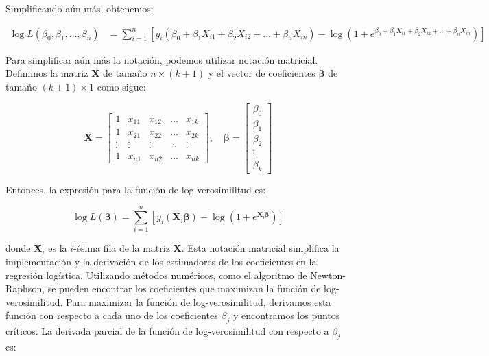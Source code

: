 Simplificando aún más, obtenemos:

\begin{eqnarray}
\log L(\beta_0, \beta_1, \ldots, \beta_n) &= \sum_{i=1}^{n} \left[ y_i (\beta_0 + \beta_1 X_{i1} + \beta_2 X_{i2} + \ldots + \beta_n X_{in}) - \log(1 + e^{\beta_0 + \beta_1 X_{i1} + \beta_2 X_{i2} + \ldots + \beta_n X_{in}}) \right]
\end{eqnarray}


Para simplificar aún más la notación, podemos utilizar notación matricial. Definimos la matriz $\mathbf{X}$ de tamaño $n \times (k+1)$ y el vector de coeficientes $\boldsymbol{\beta}$ de tamaño $(k+1) \times 1$ como sigue:

\begin{equation}
\mathbf{X} = \begin{bmatrix}
1 & x_{11} & x_{12} & \ldots & x_{1k} \\
1 & x_{21} & x_{22} & \ldots & x_{2k} \\
\vdots & \vdots & \vdots & \ddots & \vdots \\
1 & x_{n1} & x_{n2} & \ldots & x_{nk}
\end{bmatrix}, \quad
\boldsymbol{\beta} = \begin{bmatrix}
\beta_0 \\
\beta_1 \\
\beta_2 \\
\vdots \\
\beta_k
\end{bmatrix}
\end{equation}

Entonces, la expresión para la función de log-verosimilitud es:

\begin{equation}
\log L(\boldsymbol{\beta}) = \sum_{i=1}^{n} \left[ y_i (\mathbf{X}_i \boldsymbol{\beta}) - \log(1 + e^{\mathbf{X}_i \boldsymbol{\beta}}) \right]
\end{equation}

donde $\mathbf{X}_i$ es la $i$-ésima fila de la matriz $\mathbf{X}$.  Esta notación matricial simplifica la implementación y la derivación de los estimadores de los coeficientes en la regresión logística. Utilizando métodos numéricos, como el algoritmo de Newton-Raphson, se pueden encontrar los coeficientes que maximizan la función de log-verosimilitud. Para maximizar la función de log-verosimilitud, derivamos esta función con respecto a cada uno de los coeficientes $\beta_j$ y encontramos los puntos críticos. La derivada parcial de la función de log-verosimilitud con respecto a $\beta_j$ es:

